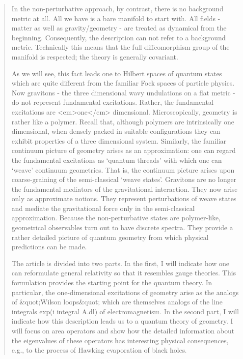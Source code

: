 \begin{quote}
In the non-perturbative approach, by contrast, there is no background
metric at all.  All we have is a bare manifold to start with.  All
fields - matter as well as gravity/geometry - are treated as dynamical
from the beginning. Consequently, the description can not refer to a
background metric.  Technically this means that the full diffeomorphism
group of the manifold is respected; the theory is generally covariant.

As we will see, this fact leads one to Hilbert spaces of quantum states
which are quite different from the familiar Fock spaces of particle
physics.  Now gravitons - the three dimensional wavy undulations on a
flat metric - do not represent fundamental excitations. Rather, the
fundamental excitations are <em>one</em> dimensional.  Microscopically, geometry
is rather like a polymer.  Recall that, although polymers are
intrinsically one dimensional, when densely packed in suitable
configurations they can exhibit properties of a three dimensional
system.  Similarly, the familiar continuum picture of geometry arises as
an approximation: one can regard the fundamental excitations as `quantum
threads' with which one can `weave' continuum geometries.  That is, the
continuum picture arises upon coarse-graining of the semi-classical
`weave states'.  Gravitons are no longer the fundamental mediators of the
gravitational interaction.  They now arise only as approximate notions. 
They represent perturbations of weave states and mediate the
gravitational force only in the semi-classical approximation.  Because
the non-perturbative states are polymer-like, geometrical observables
turn out to have discrete spectra.  They provide a rather detailed
picture of quantum geometry from which physical predictions can be made.

The article is divided into two parts.  In the first, I will indicate
how one can reformulate general relativity so that it resembles gauge
theories.  This formulation provides the starting point for the quantum
theory.  In particular, the one-dimensional excitations of geometry
arise as the analogs of &quot;Wilson loops&quot; which are 
themselves analogs of
the line integrals exp(i integral A.dl) of electromagnetism.  In the
second part, I will indicate how this description leads us to a quantum
theory of geometry.  I will focus on area operators and show how the
detailed information about the eigenvalues of these operators has
interesting physical consequences, e.g., to the process of Hawking
evaporation of black holes.
\end{quote}
    

